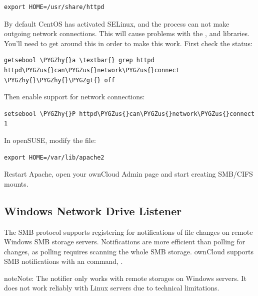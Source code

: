 \documentclass[letterpaper,10pt,english]{sphinxmanual}
\def\PYGZus{\char`\_}
\def\PYGZgt{\char`\>}
\def\PYGZhy{\char`\-}
\begin{document}
\begin{Verbatim}[commandchars=\\\{\}]
export HOME=/usr/share/httpd
\end{Verbatim}

By default CentOS has activated SELinux, and the  process can not make
outgoing network connections. This will cause problems with the ,
and  libraries. You'll need to get around this in order to make
this work. First check the status:

\begin{Verbatim}[commandchars=\\\{\}]
getsebool \PYGZhy{}a \textbar{} grep httpd
httpd\PYGZus{}can\PYGZus{}network\PYGZus{}connect \PYGZhy{}\PYGZhy{}\PYGZgt{} off
\end{Verbatim}

Then enable support for network connections:

\begin{Verbatim}[commandchars=\\\{\}]
setsebool \PYGZhy{}P httpd\PYGZus{}can\PYGZus{}network\PYGZus{}connect 1
\end{Verbatim}

In openSUSE, modify the  file:

\begin{Verbatim}[commandchars=\\\{\}]
export HOME=/var/lib/apache2
\end{Verbatim}

Restart Apache, open your ownCloud Admin page and start creating SMB/CIFS
mounts.


\subsection{Windows Network Drive Listener}
\label{enterprise_external_storage/windows-network-drive_configuration:windows-network-drive-listener}
The SMB protocol supports registering for notifications of file changes on remote Windows SMB storage servers. Notifications are more efficient than polling for changes, as polling requires scanning the whole SMB storage. ownCloud supports SMB notifications with an  command, .

\begin{notice}{note}{Note:}
The notifier only works with remote storages on Windows servers. It does not work reliably with Linux servers due to technical limitations.
\end{notice}
\end{document}
